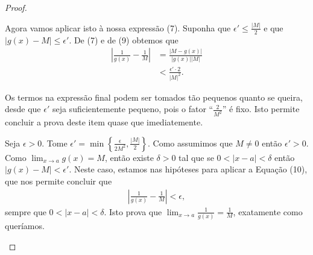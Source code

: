 \begin{proof}
\begin{enumerate}
		Agora vamos aplicar isto à nossa expressão (7). Suponha que $\epsilon'\leq\frac{|M|}{2}$ e que $|g(x)-M|\leq\epsilon'$. De (7) e de (9) obtemos que
		\begin{align*}
			\left|\frac{1}{g(x)}-\frac{1}{M}\right|
				&=\frac{|M-g(x)|}{|g(x)||M|}\\
				&<\frac{\epsilon'\cdot 2}{|M|^2}.\tag{10}
		\end{align*}
		
		Os termos na expressão final podem ser tomados tão pequenos quanto se queira, desde que $\epsilon'$ seja suficientemente pequeno, pois o fator ``$\frac{2}{M^2}$'' é fixo. Isto permite concluir a prova deste item quase que imediatemente.
		
		Seja $\epsilon>0$. Tome $\epsilon'=\min\left\{\frac{\epsilon}{2M^2},\frac{|M|}{2}\right\}$. Como assumimos que $M\neq 0$ então $\epsilon'>0$. Como $\lim_{x\to a}g(x)=M$, então existe $\delta>0$ tal que se $0<|x-a|<\delta$ então $|g(x)-M|<\epsilon'$. Neste caso, estamos nas hipóteses para aplicar a Equação (10), que nos permite concluir que
		\begin{align*}
			\left|\frac{1}{g(x)}-\frac{1}{M}\right|<\epsilon,
		\end{align*}
		sempre que $0<|x-a|<\delta$. Isto prova que $\lim_{x\to a}\frac{1}{g(x)}=\frac{1}{M}$, exatamente como queríamos.
	\end{enumerate}
\end{proof}